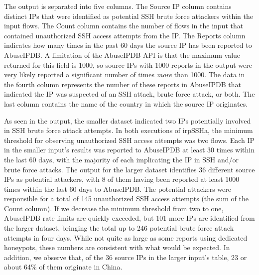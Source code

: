 The output is separated into five columns. The Source IP column contains distinct IPs that were identified as potential SSH brute force attackers within the input flows. The Count column contains the number of flows in the input that contained unauthorized SSH access attempts from the IP. The Reports column indicates how many times in the past 60 days the source IP has been reported to AbuseIPDB. A limitation of the AbuseIPDB API is that the maximum value returned for this field is 1000, so source IPs with 1000 reports in the output were very likely reported a significant number of times \textit{more} than 1000. The data in the fourth column represents the number of these reports in AbuseIPDB that indicated the IP was suspected of an SSH attack, brute force attack, or both. The last column contains the name of the country in which the source IP originates.

As seen in the output, the smaller dataset indicated two IPs potentially involved in SSH brute force attack attempts. In both executions of irpSSHa, the minimum threshold for observing unauthorized SSH access attempts was two flows. Each IP in the smaller input's results was reported to AbuseIPDB at least 30 times within the last 60 days, with the majority of each implicating the IP in SSH and/or brute force attacks. The output for the larger dataset identifies 36 different source IPs as potential attackers, with 8 of them having been reported at least 1000 times within the last 60 days to AbuseIPDB. The potential attackers were responsible for a total of 145 unauthorized SSH access attempts (the sum of the Count column). If we decrease the minimum threshold from two to one, AbuseIPDB rate limits are quickly exceeded, but 101 more IPs are identified from the larger dataset, bringing the total up to 246 potential brute force attack attempts in four days. While not quite as large as some reports using dedicated honeypots, these numbers are consistent with what would be expected. In addition, we observe that, of the 36 source IPs in the larger input's table, 23 or about 64\% of them originate in China.
\label{sec:eval}

